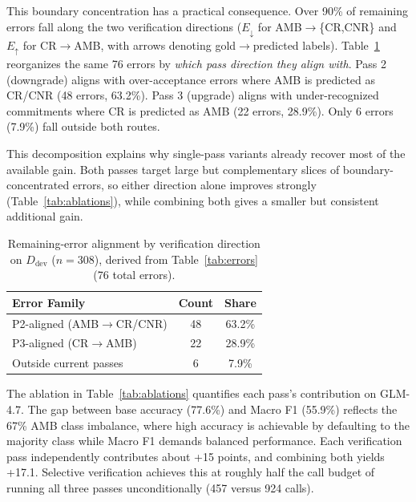 \documentclass[11pt]{article}
\newcommand{\rev}[1]{#1}
\begin{document}
This boundary concentration has a practical consequence. Over 90\% of remaining errors fall along the two verification directions \rev{($E_{\downarrow}$ for AMB$\rightarrow$\{CR,CNR\} and $E_{\uparrow}$ for CR$\rightarrow$AMB, with arrows denoting gold$\rightarrow$predicted labels)}.
Table~\ref{tab:coverage} reorganizes the same 76 errors by \emph{which pass direction they align with}. Pass 2 (downgrade) \rev{aligns with} over-acceptance errors where AMB is predicted as CR/CNR (48 errors, 63.2\%). Pass 3 (upgrade) \rev{aligns with} under-recognized commitments where CR is predicted as AMB (22 errors, 28.9\%). Only 6 errors (7.9\%) fall outside both routes.

This decomposition explains why single-pass variants already recover most of the available gain. Both passes target large but complementary slices of boundary-concentrated errors, so either direction alone improves strongly (Table~\ref{tab:ablations}), while combining both gives a smaller but consistent additional gain.

\begin{table}[t]
\centering
\small
\begin{tabular}{lcc}
\toprule
\textbf{Error Family} & \textbf{Count} & \textbf{Share} \\
\midrule
P2-aligned (AMB$\rightarrow$CR/CNR) & 48 & 63.2\% \\
P3-aligned (CR$\rightarrow$AMB) & 22 & 28.9\% \\
Outside current passes & 6 & 7.9\% \\
\bottomrule
\end{tabular}
\caption{Remaining-error alignment by verification direction on $D_{\text{dev}}$ ($n{=}308$), derived from Table~\ref{tab:errors} (76 total errors).}
\label{tab:coverage}
\end{table}

The ablation in Table~\ref{tab:ablations} quantifies each pass's contribution on GLM-4.7. The gap between base accuracy (77.6\%) and Macro F1 (55.9\%) reflects the 67\% AMB class imbalance, where high accuracy is achievable by defaulting to the majority class while Macro F1 demands balanced performance. Each verification pass independently contributes about +15 points, and combining both yields +17.1. Selective verification achieves this at roughly half the call budget of running all three passes unconditionally (457 versus 924 calls).
\end{document}
